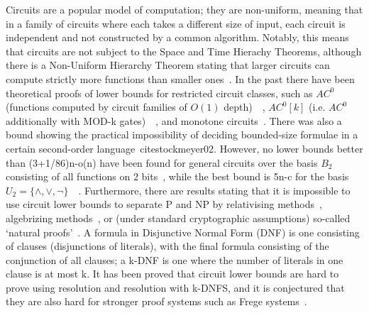 \documentclass{article}
\begin{document}
Circuits are a popular model of computation; they are non-uniform, meaning that in a family of circuits where each takes a different size of input, each circuit is independent and not constructed by a common algorithm. Notably, this means that circuits are not subject to the Space and Time Hierachy Theorems, although there is a Non-Uniform Hierarchy Theorem stating that larger circuits can compute strictly more functions than smaller ones~\cite{arora}. In the past there have been theoretical proofs of lower bounds for restricted circuit classes, such as $AC^0$ (functions computed by circuit families of $O(1)$ depth)~\cite{furst81}~\cite{ajtai83}, $AC^0[k]$ (i.e. $AC^0$ additionally with MOD-k gates)~\cite{razborov87}~\cite{smolensky87}, and monotone circuits~\cite{razborov85}. There was also a bound showing the practical impossibility of deciding bounded-size formulae in a certain second-order language~cite{stockmeyer02}. However, no lower bounds better than (3+1/86)n-o(n) have been found for general circuits over the basis $B_2$ consisting of all functions on 2 bits~\cite{find16}, while the best bound is 5n-c for the basis $U_2 = \{ \land, \lor, \neg\}$~\cite{lachish01}~\cite{iwama02}. Furthermore, there are results stating that it is impossible to use circuit lower bounds to separate P and NP by relativising methods~\cite{baker75}, algebrizing methods~\cite{aaronson09}, or (under standard cryptographic assumptions) so-called `natural proofs'~\cite{razborov94}. A formula in Disjunctive Normal Form (DNF) is one consisting of clauses (disjunctions of literals), with the final formula consisting of the conjunction of all clauses; a k-DNF is one where the number of literals in one clause is at most k. It has been proved that circuit lower bounds are hard to prove using resolution and resolution with k-DNFS, and it is conjectured that they are also hard for stronger proof systems such as Frege systems~\cite{raz}. 
\end{document}
